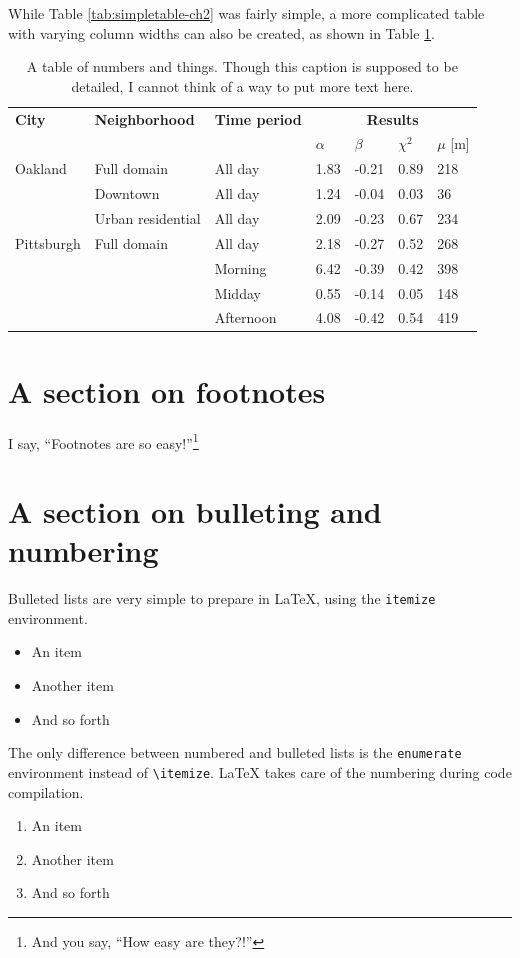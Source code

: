 While Table \ref{tab:simpletable-ch2} was fairly simple, a more complicated table with varying column widths can also be created, as shown in Table \ref{tab:complextable-ch2}.

\begin{table}[!h]
\caption[A slightly more complex table]{A table of numbers and things. Though this caption is supposed to be detailed, I cannot think of a way to put more text here.}
\label{tab:complextable-ch2}
\begin{tabular}{|p{20mm}|p{40mm}|p{30mm}|p{10mm}p{10mm}p{10mm}p{10mm}|}
\hline
\textbf{City}&\textbf{Neighborhood}&\textbf{Time period}&\multicolumn{4}{c|}{\textbf{Results}}\\
&	&	& $\alpha$&$\beta$&$\chi^2$&$\mu$ [m]\\
\hline
Oakland&Full domain&All day&1.83&-0.21&0.89&218\\
 &Downtown&All day&1.24&-0.04&0.03&36\\
 &Urban residential&All day&2.09&-0.23&0.67&234\\
 \hline
Pittsburgh&Full domain&All day&2.18&-0.27&0.52&268\\
 & &Morning&6.42&-0.39&0.42&398\\
 &	 &Midday&0.55&-0.14&0.05&148\\
 & &Afternoon&4.08&-0.42&0.54&419\\
\hline
\end{tabular}
\end{table}

\section{A section on footnotes}\label{sec-footnotes-ch2}
I say, ``Footnotes are so easy!''\footnote{And you say, ``How easy are they?!''}

\section{A section on bulleting and numbering}\label{sec-itemizing-ch2}
Bulleted lists are very simple to prepare in \LaTeX{}, using the \verb|itemize| environment.
\begin{itemize}
\item An item
\item Another item
\item And so forth
\end{itemize}

The only difference between numbered and bulleted lists is the \verb|enumerate| environment instead of \verb|\itemize|. \LaTeX{} takes care of the numbering during code compilation.
\begin{enumerate}
\item An item
\item Another item
\item And so forth
\end{enumerate}

